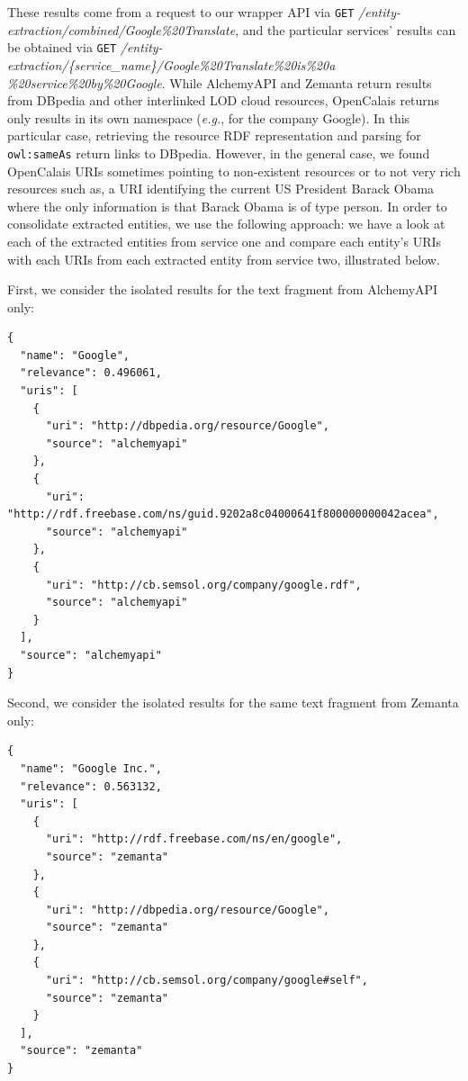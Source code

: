 These results come from a request to our wrapper API via \texttt{GET} \textit{/entity-extraction/combined/Google\%20Translate},
and the particular services' results can be obtained via \texttt{GET} \textit{/entity-extraction/\{service\_name\}/Google\%20Translate\%20is\%20a\\\%20service\%20by\%20Google}.
While AlchemyAPI and Zemanta return results from DBpedia and other interlinked LOD cloud resources, OpenCalais returns
only results in its own namespace
(\emph{e.g.},  for the
company Google). In this particular case, retrieving the resource RDF representation and parsing for
\texttt{owl:sameAs} return links to DBpedia. However, in the general case, we found OpenCalais URIs sometimes pointing
to non-existent resources or to not very rich resources such
as, a URI identifying
the current US President Barack Obama where the only information is that Barack Obama is of type person. In order to
consolidate extracted entities, we use the following approach: we have a look at each of the extracted entities from
service one and compare each entity's URIs with each URIs from each extracted entity from service two, illustrated below.

First, we consider the isolated results for the text fragment from AlchemyAPI only:

\begin{lstlisting}
{
  "name": "Google",
  "relevance": 0.496061,
  "uris": [
    {
      "uri": "http://dbpedia.org/resource/Google",
      "source": "alchemyapi"
    },
    {
      "uri": "http://rdf.freebase.com/ns/guid.9202a8c04000641f800000000042acea",
      "source": "alchemyapi"
    },
    {
      "uri": "http://cb.semsol.org/company/google.rdf",
      "source": "alchemyapi"
    }
  ],
  "source": "alchemyapi"
}
\end{lstlisting}

Second, we consider the isolated results for the same text fragment from Zemanta only:

\begin{lstlisting}
{
  "name": "Google Inc.",
  "relevance": 0.563132,
  "uris": [
    {
      "uri": "http://rdf.freebase.com/ns/en/google",
      "source": "zemanta"
    },
    {
      "uri": "http://dbpedia.org/resource/Google",
      "source": "zemanta"
    },
    {
      "uri": "http://cb.semsol.org/company/google#self",
      "source": "zemanta"
    }
  ],
  "source": "zemanta"
}
\end{lstlisting}

